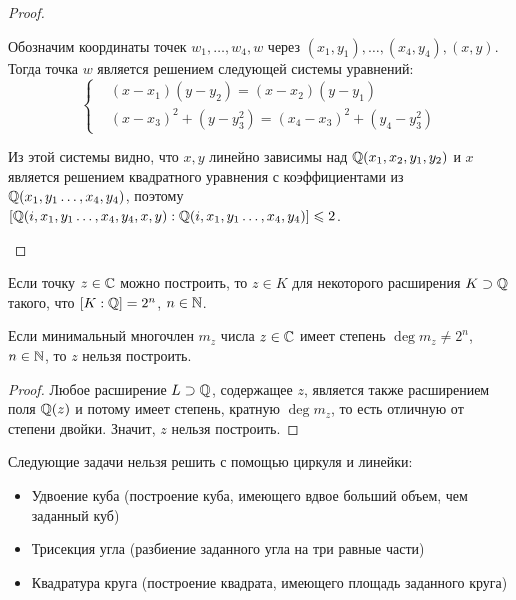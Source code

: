 \begin{proof}
\begin{itemize}
\begin{center}
		\end{center}
		
		 Обозначим координаты точек $w_1, \dotsc, w_4, w$ через $(x_1, y_1), \dotsc, (x_4, y_4), (x, y)$. Тогда точка $w$ является решением следующей системы уравнений:
		\[\left\{\begin{aligned}
			&(x - x_1)(y - y_2) = (x - x_2)(y - y_1)\\
			&(x - x_3)^2 + (y - y_3^2) = (x_4 - x_3)^2 + (y_4 - y_3^2)
		\end{aligned}\right.\]
		
		Из этой системы видно, что $x, y$ линейно зависимы над $\mathbb{Q}(x_1, x_2, y_1, y_2)$ и $x$ является решением квадратного уравнения с коэффициентами из $\mathbb{Q}(x_1, y_1 \dotsc, x_4, y_4)$, поэтому $[\mathbb{Q}(i, x_1, y_1 \dotsc, x_4, y_4, x, y) : \mathbb{Q}(i, x_1, y_1 \dotsc, x_4, y_4)] \leqslant 2$.\qedhere
	\end{itemize}
\end{proof}

\begin{corollary}
	Если точку $z \in \mathbb{C}$ можно построить, то $z \in K$ для некоторого расширения $K \supset \mathbb{Q}$ такого, что $[K : \mathbb{Q}] = 2^n$, $n \in \mathbb{N}$.
\end{corollary}

\begin{corollary}
	Если минимальный многочлен $m_z$ числа $z \in \mathbb{C}$ имеет степень $\deg{m_z} \ne 2^n$, $n \in \mathbb{N}$, то $z$ нельзя построить.
\end{corollary}

\begin{proof}
	Любое расширение $L \supset \mathbb{Q}$, содержащее $z$, является также расширением поля $\mathbb{Q}(z)$ и потому имеет степень, кратную $\deg{m_z}$, то есть отличную от степени двойки. Значит, $z$ нельзя построить.
\end{proof}

\begin{theorem}
	Следующие задачи нельзя решить с помощью циркуля и линейки:
	\begin{itemize}
		\item Удвоение куба (построение куба, имеющего вдвое больший объем, чем заданный куб)
		\item Трисекция угла (разбиение заданного угла на три равные части)
		\item Квадратура круга (построение квадрата, имеющего площадь заданного круга)
	\end{itemize}
\end{theorem}

